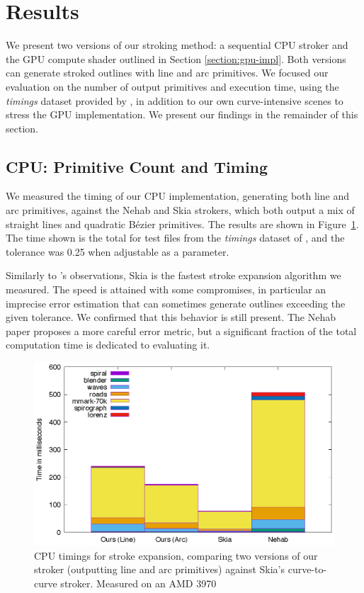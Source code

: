 \documentclass[sigconf]{acmart}
\begin{document}

\section{Results}


We present two versions of our stroking method: a sequential CPU stroker and the GPU compute shader outlined in Section \ref{section:gpu-impl}. Both versions can generate stroked outlines with line and arc primitives. We focused our evaluation on the number of output primitives and execution time, using the \emph{timings} dataset provided by \citet{Nehab2020}, in addition to our own curve-intensive scenes to stress the GPU implementation. We present our findings in the remainder of this section.

\subsection{CPU: Primitive Count and Timing}

We measured the timing of our CPU implementation, generating both line and arc primitives, against the Nehab and Skia strokers, which both output a mix of straight lines and quadratic Bézier primitives. The results are shown in Figure~\ref{fig:timings}. The time shown is the total for test files from the \emph{timings} dataset of \citet{Nehab2020}, and the tolerance was 0.25 when adjustable as a parameter.

Similarly to \citet{Nehab2020}'s observations, Skia is the fastest stroke expansion algorithm we measured. The speed is attained with some compromises, in particular an imprecise error estimation that can sometimes generate outlines exceeding the given tolerance. We confirmed that this behavior is still present. The Nehab paper proposes a more careful error metric, but a significant fraction of the total computation time is dedicated to evaluating it.

\begin{figure}
    \includegraphics[scale=0.6]{timings}
    \caption{CPU timings for stroke expansion, comparing two versions of our stroker (outputting line and arc primitives) against Skia's curve-to-curve stroker. Measured on an AMD 3970}
    \label{fig:timings}
\end{figure}
\end{document}
